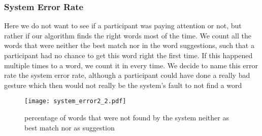 \subsubsection{System Error Rate}
Here we do not want to see if a participant was paying attention or not, but rather if our algorithm finds the right words most of the time. We count all the words that were neither the best match nor in the word suggestions, such that a participant had no chance to get this word right the first time. If this happened multiple times to a word, we count it in every time. We decide to name this error rate the system error rate, although a participant could have done a really bad gesture which then would not really be the system's fault to not find a word
\iffalse
\begin{figure}[H]
    \makebox[\textwidth][c]{
        \centering
        \subbottom[with characters\label{fig:error_system:error_system1}]{\texttt{[image: system\_error2\_1.png]}}\hspace{-3.0em}
        \subbottom[with words\label{fig:error_system:error_system2}]{\texttt{[image: system\_error2\_2.png]}}
    }
    \caption{percentage of characters/words that were not found by the system neither as best match nor as suggestion}
    \label{fig:error_system}
\end{figure}
\fi

\begin{figure}[H]
    \centering
    \texttt{[image: system\_error2\_2.pdf]}
    \caption{percentage of words that were not found by the system neither as best match nor as suggestion}
    \label{fig:error_system}
\end{figure}



